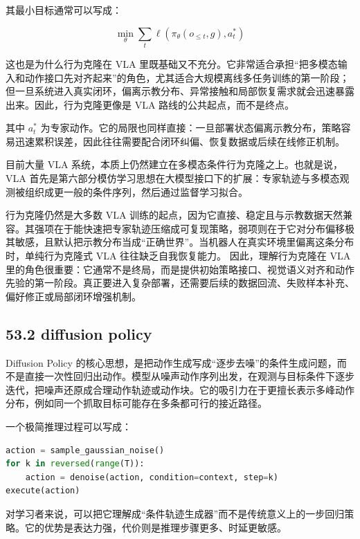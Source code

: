 其最小目标通常可以写成：

\begingroup
\footnotesize
\begin{equation*}
\min_\theta \sum_t \ell(\pi_\theta(o_{\le t}, g), a_t^\ast)
\end{equation*}
\endgroup

这也是为什么行为克隆在 VLA 里既基础又不充分。它非常适合承担“把多模态输入和动作接口先对齐起来”的角色，尤其适合大规模离线多任务训练的第一阶段；但一旦系统进入真实闭环，偏离示教分布、异常接触和局部恢复需求就会迅速暴露出来。因此，行为克隆更像是 VLA 路线的公共起点，而不是终点。

其中 \(a_t^\ast\) 为专家动作。它的局限也同样直接：一旦部署状态偏离示教分布，策略容易迅速累积误差，因此往往需要配合闭环纠偏、恢复数据或后续在线修正机制。

目前大量 VLA 系统，本质上仍然建立在多模态条件行为克隆之上。也就是说，VLA 首先是第六部分模仿学习思想在大模型接口下的扩展：专家轨迹与多模态观测被组织成更一般的条件序列，然后通过监督学习拟合。

行为克隆仍然是大多数 VLA 训练的起点，因为它直接、稳定且与示教数据天然兼容。其强项在于能快速把专家轨迹压缩成可复现策略，弱项则在于它对分布偏移极其敏感，且默认把示教分布当成“正确世界”。当机器人在真实环境里偏离这条分布时，单纯行为克隆式 VLA 往往缺乏自我恢复能力。 因此，理解行为克隆在 VLA 里的角色很重要：它通常不是终局，而是提供初始策略接口、视觉语义对齐和动作先验的第一阶段。真正要进入复杂部署，还需要后续的数据回流、失败样本补充、偏好修正或局部闭环增强机制。

\subsection*{53.2 diffusion policy}


Diffusion Policy 的核心思想，是把动作生成写成“逐步去噪”的条件生成问题，而不是直接一次性回归出动作。模型从噪声动作序列出发，在观测与目标条件下逐步迭代，把噪声还原成合理动作轨迹或动作块。它的吸引力在于更擅长表示多峰动作分布，例如同一个抓取目标可能存在多条都可行的接近路径。

一个极简推理过程可以写成：

\begin{lstlisting}[language=python]
action = sample_gaussian_noise()
for k in reversed(range(T)):
    action = denoise(action, condition=context, step=k)
execute(action)
\end{lstlisting}

对学习者来说，可以把它理解成“条件轨迹生成器”而不是传统意义上的一步回归策略。它的优势是表达力强，代价则是推理步骤更多、时延更敏感。


